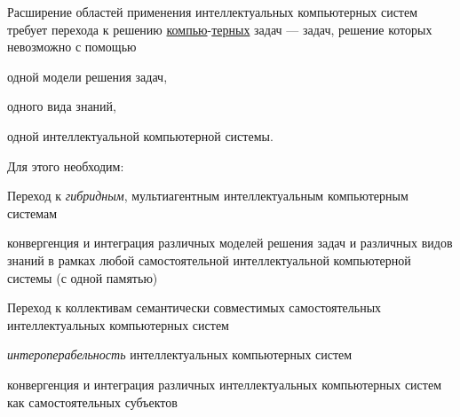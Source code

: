 Расширение областей применения интеллектуальных компьютерных систем требует перехода к решению \underline{компью}-\underline{терных} задач --- задач, решение которых невозможно с помощью
\begin{textitemize}
	\item одной модели решения задач,
	\item одного вида знаний,
	\item одной интеллектуальной компьютерной системы.
\end{textitemize}

Для этого необходим:
\begin{textitemize}
	\item Переход к \textit{гибридным}, мультиагентным интеллектуальным компьютерным системам
	\begin{textitemize}
		\item конвергенция и интеграция различных моделей решения задач и различных видов знаний в рамках любой самостоятельной интеллектуальной компьютерной системы (с одной памятью)
	\end{textitemize}
	\item Переход к коллективам семантически совместимых самостоятельных интеллектуальных компьютерных систем
	\begin{textitemize}
		\item \textit{интероперабельность} интеллектуальных компьютерных систем
		\item конвергенция и интеграция различных интеллектуальных компьютерных систем как самостоятельных субъектов
	\end{textitemize}
\end{textitemize}

